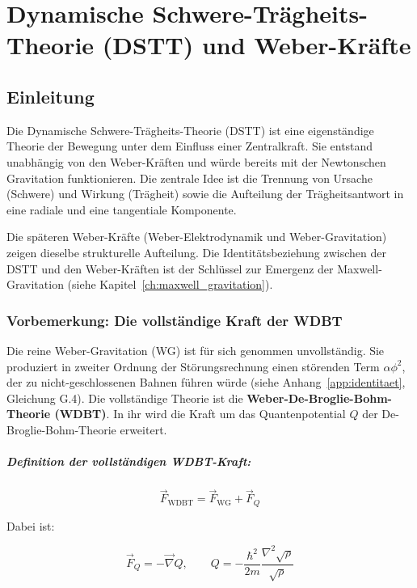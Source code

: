 \chapter{Dynamische Schwere-Trägheits-Theorie (DSTT) und Weber-Kräfte}
\label{ch:dstt_weber}

\section{Einleitung}
\label{sec:dstt_einleitung}

Die Dynamische Schwere-Trägheits-Theorie (DSTT) ist eine eigenständige Theorie der Bewegung unter dem Einfluss einer Zentralkraft. Sie entstand unabhängig von den Weber-Kräften und würde bereits mit der Newtonschen Gravitation funktionieren. Die zentrale Idee ist die Trennung von Ursache (Schwere) und Wirkung (Trägheit) sowie die Aufteilung der Trägheitsantwort in eine radiale und eine tangentiale Komponente.

Die späteren Weber-Kräfte (Weber-Elektrodynamik und Weber-Gravitation) zeigen dieselbe strukturelle Aufteilung. Die Identitätsbeziehung zwischen der DSTT und den Weber-Kräften ist der Schlüssel zur Emergenz der Maxwell-Gravitation (siehe Kapitel~\ref{ch:maxwell_gravitation}).

\subsection{Vorbemerkung: Die vollständige Kraft der WDBT}
\label{sec:wdbt_kraft}

Die reine Weber-Gravitation (WG) ist für sich genommen unvollständig. Sie produziert in zweiter Ordnung der Störungsrechnung einen störenden Term \(\alpha\phi^2\), der zu nicht-geschlossenen Bahnen führen würde (siehe Anhang~\ref{app:identitaet}, Gleichung G.4). Die vollständige Theorie ist die \textbf{Weber-De-Broglie-Bohm-Theorie (WDBT)}. In ihr wird die Kraft um das Quantenpotential \(Q\) der De-Broglie-Bohm-Theorie erweitert.

\paragraph{Definition der vollständigen WDBT-Kraft:}

\[
\boxed{\vec{F}_{\text{WDBT}} = \vec{F}_{\text{WG}} + \vec{F}_Q}
\]

Dabei ist:

\[
\vec{F}_Q = -\vec{\nabla}Q, \qquad 
Q = -\frac{\hbar^2}{2m} \frac{\nabla^2 \sqrt{\rho}}{\sqrt{\rho}}
\]

